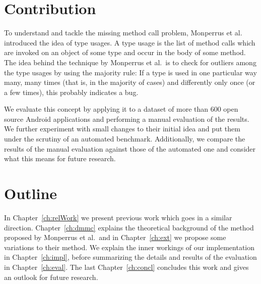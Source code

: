 
\section{Contribution}

To understand and tackle the missing method call problem, Monperrus et al.~\cite{monperrus2010detecting}\cite{monperrus2013detecting} introduced the idea of type usages.
A type usage is the list of method calls which are invoked on an object of some type and occur in the body of some method.
The idea behind the technique by Monperrus et al.\ is to check for outliers among the type usages by using the majority rule:
If a type is used in one particular way many, many times (that is, in the majority of cases) and differently only once (or a few times), this probably indicates a bug.

We evaluate this concept by applying it to a dataset of more than 600 open source Android applications and performing a manual evaluation of the results.
We further experiment with small changes to their initial idea and put them under the scrutiny of an automated benchmark.
Additionally, we compare the results of the manual evaluation against those of the automated one and consider what this means for future research.

\section{Outline}

In Chapter~\ref{ch:relWork} we present previous work which goes in a similar direction.
Chapter~\ref{ch:dmmc} explains the theoretical background of the method proposed by Monperrus et al.\ and in Chapter~\ref{ch:ext} we propose some variations to their method.
We explain the inner workings of our implementation in Chapter~\ref{ch:impl}, before summarizing the details and results of the evaluation in Chapter~\ref{ch:eval}.
The last Chapter~\ref{ch:concl} concludes this work and gives an outlook for future research.

